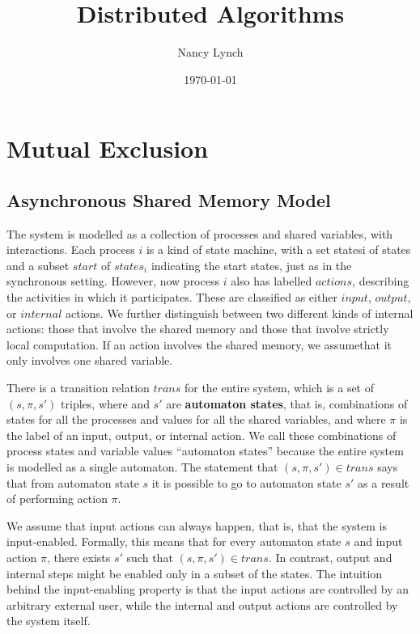 \documentclass[11pt]{article}
\author{Nancy Lynch}
\date{\today}
\title{Distributed Algorithms}
\begin{document}
\maketitle
\tableofcontents

\section{Mutual Exclusion}
\label{sec:orgd2ea250}

\subsection{Asynchronous Shared Memory Model}
\label{sec:org16414bd}
The system is modelled as a collection of processes and shared variables,
with interactions. Each process \(i\) is a kind of state machine, with a set statesi of states and a subset \(start\) of \(states_i\) indicating the
start states, just as in the synchronous setting. However, now process \(i\) also has labelled
\(actions\), describing the activities in which it participates. These are classified as either
\(input\), \(output\), or \(internal\) actions. We further distinguish between two different kinds of
internal actions: those that involve the shared memory and those that involve strictly local
computation. If an action involves the shared memory, we assumethat it only involves one shared
variable.

There is a transition relation \(trans\) for the entire system, which is a set of \((s,\pi,s')\)
triples, where and \(s'\) are \textbf{automaton states}, that is, combinations of states for all the
processes and values for all the shared variables, and where \(\pi\)  is the label of an input,
output, or internal action. We call these combinations of process states and variable values
``automaton states'' because  the entire system is modelled as a single automaton. The statement that
\((s,\pi,s')\in trans\) says that from automaton state \(s\) it is possible to go to automaton state
\(s'\) as a result of performing action \(\pi\).

We assume that input actions can always happen, that is, that the system is input-enabled. Formally,
this means that for every automaton state \(s\) and input action \(\pi\), there exists \(s'\) such
that \((s,\pi,s')\in trans\). In contrast, output and internal steps might be enabled only in a subset
of the states. The intuition behind the input-enabling property is that the input actions are
controlled by an arbitrary external user, while the internal and output actions are controlled by the
system itself.
\end{document}
